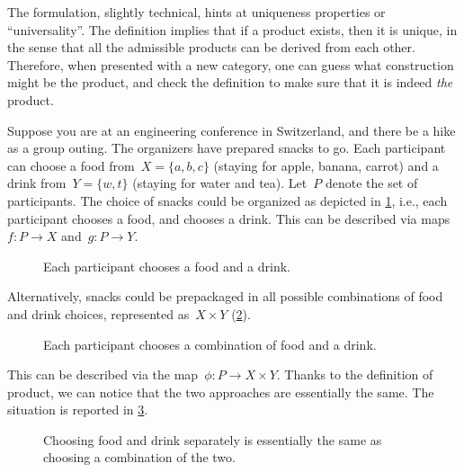 The formulation, slightly technical, hints at uniqueness properties or ``universality''. The definition implies that if a product exists, then it is unique, in the sense that all the admissible products can be derived from each other. Therefore, when presented with a new category, one can guess what construction might be the product, and check the definition to make sure that it is indeed \emph{the} product.

\begin{example}
Suppose you are at an engineering conference in Switzerland, and there be a hike as a group outing. The organizers have prepared snacks to go. Each participant can choose a food from~$X=\{a,b,c\}$ (staying for apple, banana, carrot) and a drink from~$Y=\{w,t\}$ (staying for water and tea). Let~$P$ denote the set of participants. The choice of snacks could be organized as depicted in \cref{fig:snacks_1}, i.e., each participant chooses a food, and chooses a drink. This can be described via maps~$f\colon P\to X$ and~$g\colon P\to Y$.

\begin{figure}[h!]
\begin{center}
\end{center}
\caption{Each participant chooses a food and a drink. \label{fig:snacks_1}}
\end{figure}

Alternatively, snacks could be prepackaged in all possible combinations of food and drink choices, represented as~$X\times Y$ (\cref{fig:snacks_2}).

\begin{figure}[h!]
\begin{center}
\end{center}
\caption{Each participant chooses a combination of food and a drink. \label{fig:snacks_2}}
\end{figure}

This can be described via the map~$\phi\colon P\to X\times Y$. Thanks to the definition of product, we can notice that the two approaches are essentially the same. The situation is reported in \cref{fig:snacks_3}.

\begin{figure}[h!]
\begin{center}
\end{center}
\caption{Choosing food and drink separately is essentially the same as choosing a combination of the two. \label{fig:snacks_3}}
\end{figure}


\end{example}
